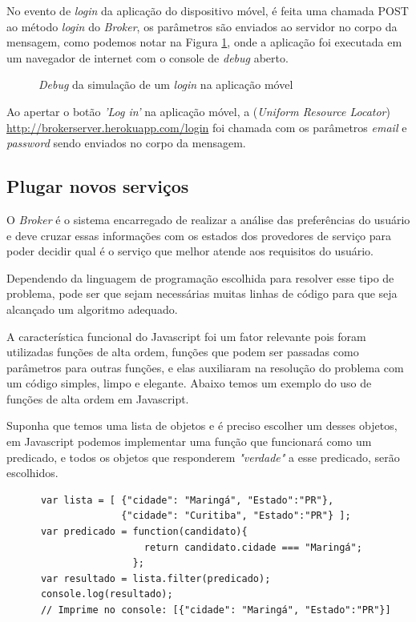 No evento de \textit{login} da aplicação do dispositivo móvel, é feita uma chamada POST ao método \textit{login} do \textit{Broker}, os parâmetros são enviados ao servidor no corpo da mensagem, como podemos notar na Figura \ref{fig:logindebug}, onde a aplicação foi executada em um navegador de internet com o console de \textit{debug} aberto.

\begin{figure}[h]
  \center
  \qquad
  \caption[\textit{Debug} da simulação de um \textit{login} na aplicação móvel]{\textit{Debug} da simulação de um \textit{login} na aplicação móvel}
  \label{fig:logindebug}
\end{figure}

Ao apertar o botão \textit{'Log in'} na aplicação móvel, a  (\textit{Uniform Resource Locator}) \url{
http://brokerserver.herokuapp.com/login} foi chamada com os parâmetros \textit{email} e \textit{password} sendo enviados no corpo da mensagem.

\subsection{Plugar novos serviços}
O \textit{Broker} é o sistema encarregado de realizar a análise das preferências do usuário e deve cruzar essas informações com os estados dos provedores de serviço para poder decidir qual é o serviço que melhor atende aos requisitos do usuário.

Dependendo da linguagem de programação escolhida para resolver esse tipo de problema, pode ser que sejam necessárias muitas linhas de código para que seja alcançado um algoritmo adequado.

A característica funcional do Javascript foi um fator relevante pois foram utilizadas funções de alta ordem, funções que podem ser passadas como parâmetros para outras funções, e elas auxiliaram na resolução do problema com um código simples, limpo e elegante. Abaixo temos um exemplo do uso de funções de alta ordem em Javascript.

Suponha que temos uma lista de objetos e é preciso escolher um desses objetos, em Javascript podemos implementar uma função que funcionará como um predicado, e todos os objetos que responderem \textit{"verdade"} a esse predicado, serão escolhidos.

\begin{footnotesize}
  \begin{verbatim}
      var lista = [ {"cidade": "Maringá", "Estado":"PR"},
                    {"cidade": "Curitiba", "Estado":"PR"} ];
      var predicado = function(candidato){
                        return candidato.cidade === "Maringá";
                      };
      var resultado = lista.filter(predicado);
      console.log(resultado);
      // Imprime no console: [{"cidade": "Maringá", "Estado":"PR"}]
  \end{verbatim}
\end{footnotesize}

